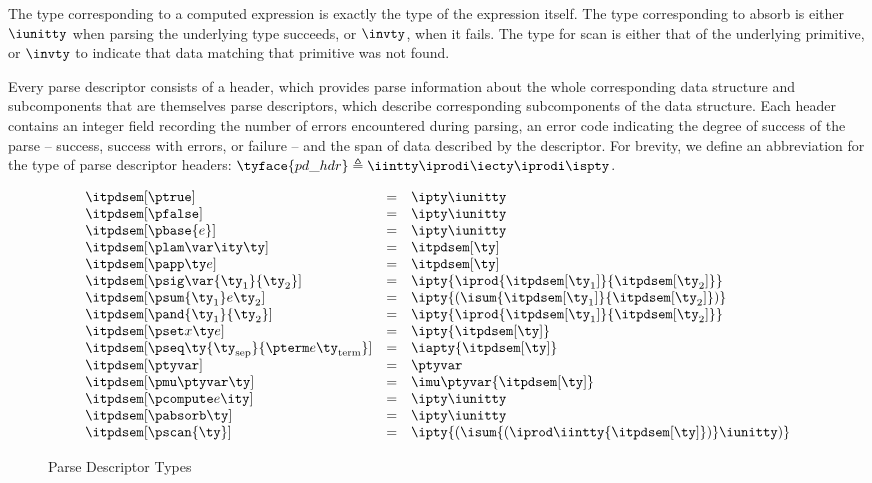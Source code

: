 The type corresponding to a computed expression is exactly the type of
the expression itself.  The type corresponding to absorb is either
$\iunitty$ when parsing the underlying type succeeds, or $\invty$,
when it fails. The type for scan is either that of the underlying
primitive, or $\invty$ to indicate that data matching that primitive
was not found.

Every parse descriptor consists of a header, which provides parse
information about the whole corresponding data structure and
subcomponents that are themselves parse descriptors, which describe
corresponding subcomponents of the data structure. Each header
contains an integer field recording the number of errors encountered
during parsing, an error code indicating the degree of success of the
parse -- success, success with errors, or failure -- and the span of
data described by the descriptor.  For brevity, we define an
abbreviation for the type of parse descriptor headers:
$\tyface{pd\_hdr} \triangleq \iintty \iprodi \iecty \iprodi \ispty$.

\begin{figure}
\fbox{$\itpdsem[\ty] = \ity$}
\[ 
\begin{array}{lcl} 

\itpdsem[\ptrue] & = & \ipty \iunitty \\                                                  
\itpdsem[\pfalse] & = & \ipty \iunitty \\                                                  
\itpdsem[\pbase{e}] & = & \ipty \iunitty\\
\itpdsem[\plam \var \ity \ty] & = & \itpdsem[\ty] \\
\itpdsem[\papp \ty e] & = & \itpdsem[\ty] \\
\itpdsem[\psig \var {\ty_1} {\ty_2}] & = & 
               \ipty {\iprod {\itpdsem[\ty_1]} {\itpdsem[\ty_2]}} \\
\itpdsem[\psum {\ty_1} e {\ty_2}] & = & 
               \ipty {(\isum {\itpdsem[\ty_1]} {\itpdsem[\ty_2]})} \\
\itpdsem[\pand {\ty_1} {\ty_2}] & = & \ipty {\iprod {\itpdsem[\ty_1]} {\itpdsem[\ty_2]}}    \\
\itpdsem[\pset x \ty e] & = & \ipty {\itpdsem[\ty]} \\
\itpdsem[\pseq \ty {\ty_{\text{sep}}} {\pterm e {\ty_{\text{term}}}}] & = & 
  \iapty {\itpdsem[\ty]} \\
\itpdsem[\ptyvar] & = & \ptyvar \\
\itpdsem[\pmu \ptyvar \ty] & = & \imu \ptyvar {\itpdsem[\ty]} \\
\itpdsem[\pcompute e \ity]            & = & \ipty \iunitty \\
\itpdsem[\pabsorb \ty]                & = & \ipty \iunitty \\
\itpdsem[\pscan{\ty}] & = & \ipty {(\isum {(\iprod \iintty
    {\itpdsem[\ty]})} \iunitty)}
\end{array}
\]
\label{fig:pd-tys}
\caption{Parse Descriptor Types}
\end{figure}

